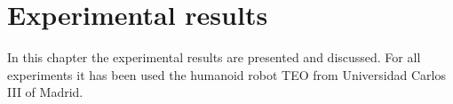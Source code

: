 \chapter{Experimental results}
In this chapter the experimental results are presented and discussed. For all experiments it has been used the humanoid robot TEO from Universidad Carlos III of Madrid.

%
